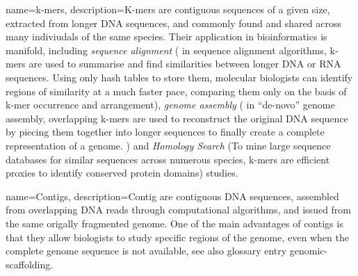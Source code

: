{name=k-mers, 
description={K-mers are contiguous sequences of a given size, extracted from longer DNA sequences, 
and commonly found and shared across many indiviudals of the same species.
 Their application in bioinformatics is manifold, including \emph{sequence alignment} (
 in sequence alignment algorithms, k-mers are used to summarise and find similarities between longer DNA or RNA sequences. Using only hash tables 
 to store them, molecular biologists can identify regions of similarity at a much faster pace, comparing them only on the basis of 
 k-mer occurrence and arrangement), \emph{genome assembly} (
 in \enquote{de-novo} genome assembly, overlapping k-mers are used to reconstruct the original DNA sequence 
 by piecing them together into longer sequences to finally create a complete representation of a genome.
) and \emph{Homology Search} (To mine large sequence databases for similar sequences across numerous species, 
k-mers are efficient proxies to identify conserved protein domains) studies.
}}

{name=Contigs, 
description={Contig are contiguous DNA sequences, assembled from overlapping DNA reads through computational algorithms,
and issued from the same origally fragmented genome. One of the main advantages of contigs is that they allow biologists to
study specific regions of the genome, even when the complete genome sequence is not available, see also glossary entry \gls{genomic-scaffolding}.
}}

